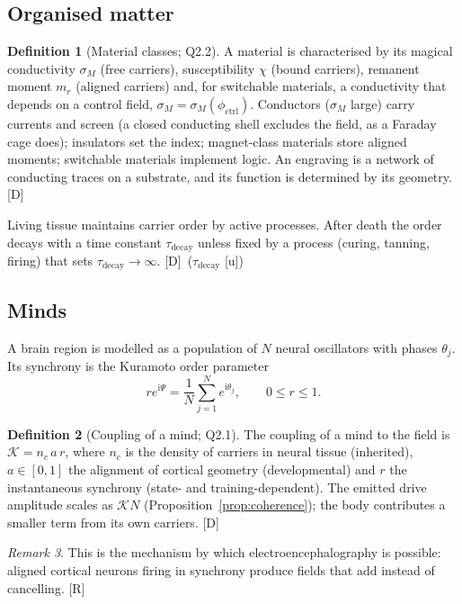 \documentclass[11pt,a4paper]{article}
\numberwithin{equation}{section}
\theoremstyle{definition}
\newtheorem{definition}{Definition}[section]
\theoremstyle{plain}
\theoremstyle{remark}
\newtheorem{remark}[definition]{Remark}
\newcommand{\ii}{\mathrm i}
\newcommand{\tagD}{\textcolor{tag}{\textsf{[D]}}}
\newcommand{\tagR}{\textcolor{tag}{\textsf{[R]}}}
\newcommand{\tagU}{\textcolor{tag}{\textsf{[u]}}}
\begin{document}
\subsection{Organised matter}
\begin{definition}[Material classes; Q2.2]
A material is characterised by its magical conductivity $\sigma_M$ (free carriers), susceptibility $\chi$ (bound carriers), remanent moment $m_r$ (aligned carriers) and, for switchable materials, a conductivity that depends on a control field, $\sigma_M=\sigma_M(\phi_{\text{ctrl}})$. Conductors ($\sigma_M$ large) carry currents and screen (a closed conducting shell excludes the field, as a Faraday cage does); insulators set the index; magnet-class materials store aligned moments; switchable materials implement logic. An engraving is a network of conducting traces on a substrate, and its function is determined by its geometry. \tagD
\end{definition}
Living tissue maintains carrier order by active processes. After death the order decays with a time constant $\tau_{\text{decay}}$ unless fixed by a process (curing, tanning, firing) that sets $\tau_{\text{decay}}\to\infty$. \tagD\ ($\tau_{\text{decay}}$ \tagU)

\subsection{Minds}
A brain region is modelled as a population of $N$ neural oscillators with phases $\theta_j$. Its synchrony is the Kuramoto order parameter \cite{kuramoto}
\begin{equation}
r e^{\ii\Psi}=\frac1N\sum_{j=1}^N e^{\ii\theta_j},\qquad 0\le r\le1 .
\end{equation}
\begin{definition}[Coupling of a mind; Q2.1]\label{def:coupling}
The coupling of a mind to the field is $\mathcal K = n_c\, a\, r$, where $n_c$ is the density of carriers in neural tissue (inherited), $a\in[0,1]$ the alignment of cortical geometry (developmental) and $r$ the instantaneous synchrony (state- and training-dependent). The emitted drive amplitude scales as $\mathcal K N$ (Proposition~\ref{prop:coherence}); the body contributes a smaller term from its own carriers. \tagD
\end{definition}
\begin{remark}
This is the mechanism by which electroencephalography is possible: aligned cortical neurons firing in synchrony produce fields that add instead of cancelling. \tagR
\end{remark}
\end{document}
